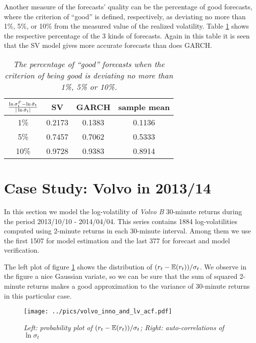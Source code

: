 Another measure of the forecasts' quality can be the percentage of good
forecasts, where the criterion of ``good'' is defined, respectively,
as deviating no more than 1\%, 5\%, or 10\% from the measured value of
the realized volatility. Table \ref{tab:nordea_2012_good} shows the
respective percentage of the 3 kinds of forecasts. Again in this table
it is seen that the SV model gives more accurate forecasts than does
GARCH.
\begin{table}[htb!]
  \centering
  \begin{tabular}{|c|c|c|c|}
    \hline
    ${\ln \sigma^F_t - \ln \hat{\sigma}_t \over |\ln \hat{\sigma}_t|}$
    & SV & GARCH & sample mean \\
    \hline
    1\% & 0.2173 & 0.1383 & 0.1136 \\
    \hline
    5\% & 0.7457 & 0.7062 & 0.5333 \\
    \hline
    10\% & 0.9728 & 0.9383 & 0.8914 \\
    \hline
  \end{tabular}
  \caption{\small \it The percentage of ``good'' forecasts when the
    criterion of being good is deviating no more than 1\%, 5\% or
    10\%.}
  \label{tab:nordea_2012_good}
\end{table}

\section{Case Study: Volvo in 2013/14}
\label{sec:volvo}
In this section we model the log-volatility of {\it Volvo B} 30-minute
returns during the period 2013/10/10 - 2014/04/04. This series
contains 1884 log-volatilities computed using 2-minute returns in each
30-minute interval. Among them we use the first 1507 for model
estimation and the last 377 for forecast and model verification.

The left plot of figure \ref{fig:volvo_inno_and_lv_acf} shows the
distribution of $(r_t - \mathbb{E}(r_t))/\sigma_t$. We observe in the figure a
nice Gaussian variate, so we can be sure that the sum of squared
2-minute returns makes a good approximation to the variance of
30-minute returns in this particular case.
\begin{figure}[htb!]
  \centering
    \texttt{[image: ../pics/volvo\_inno\_and\_lv\_acf.pdf]}
    \label{fig:volvo_inno_and_lv_acf}
  \caption{\small \it Left: probability plot of $(r_t -
    \mathbb{E}(r_t))/\sigma_t$; Right: auto-correlations of $\ln \sigma_t$}
\end{figure}

